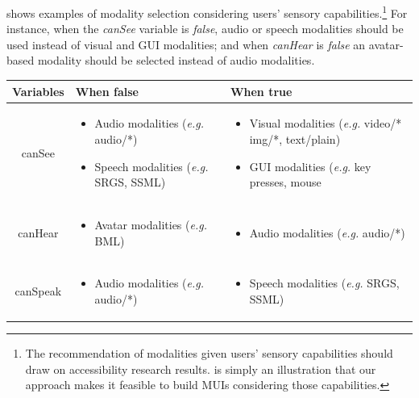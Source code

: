  shows examples of modality selection considering users’
sensory capabilities.\footnote{The recommendation of modalities given users’
sensory capabilities should draw on accessibility research results.
 is simply an illustration that our approach makes it
feasible to build MUIs considering those capabilities.} For instance, when the
\textit{canSee} variable is
\textit{false}, audio or speech modalities should be used instead of visual and
GUI modalities; and when \textit{canHear} is \textit{false} an avatar-based
modality should be selected instead of audio modalities.

\begin{table}
\scriptsize
\def\arraystretch{1.5}
\begin{tabular}[!ht]{ c m{5.5cm} m{5.5cm}}

	\hline
	\textbf{Variables} &
	\centering\arraybackslash \textbf{When false} &
	\centering\arraybackslash \textbf{When true} \\
	\hline

	canSee &
	\begin{itemize}
		\item Audio modalities \newline (\textit{e.g.} audio/*)
		\item Speech modalities \newline (\textit{e.g.} SRGS, SSML)
	\end{itemize}
	&
	\begin{itemize}
		\item Visual modalities (\textit{e.g.} \newline video/* img/*, text/plain)
		\item GUI modalities (\textit{e.g.} key presses, mouse
	\end{itemize} \\
	\hline

	canHear &
	\begin{itemize}
		\item Avatar modalities \newline (\textit{e.g.} BML)
	\end{itemize}
	&
	\begin{itemize}
		\item Audio modalities \newline (\textit{e.g.} audio/*)
	\end{itemize}\\
	\hline

	canSpeak &
	\begin{itemize}
		\item Audio modalities \newline (\textit{e.g.} audio/*)
	\end{itemize}
	&
	\begin{itemize}
		\item Speech modalities \newline (\textit{e.g.} SRGS, SSML)
	\end{itemize}\\
	\hline


\end{tabular}
\end{table}
